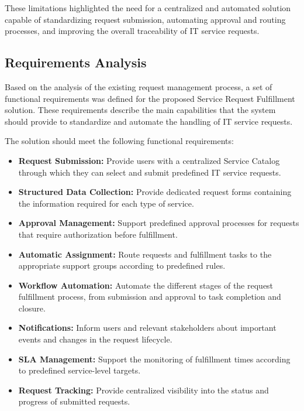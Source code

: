 \documentclass[12pt,a4paper]{report}
\begin{document}
These limitations highlighted the need for a centralized and automated
solution capable of standardizing request submission, automating approval and
routing processes, and improving the overall traceability of IT service
requests.

\subsection{Requirements Analysis}
Based on the analysis of the existing request management process, a set of
functional requirements was defined for the proposed Service Request
Fulfillment solution. These requirements describe the main capabilities that
the system should provide to standardize and automate the handling of IT
service requests.

The solution should meet the following functional requirements:
\begin{itemize}
    \item \textbf{Request Submission:} Provide users with a centralized
    Service Catalog through which they can select and submit predefined IT
    service requests.

    \item \textbf{Structured Data Collection:} Provide dedicated request
    forms containing the information required for each type of service.

    \item \textbf{Approval Management:} Support predefined approval processes
    for requests that require authorization before fulfillment.

    \item \textbf{Automatic Assignment:} Route requests and fulfillment tasks
    to the appropriate support groups according to predefined rules.

    \item \textbf{Workflow Automation:} Automate the different stages of the
    request fulfillment process, from submission and approval to task
    completion and closure.

    \item \textbf{Notifications:} Inform users and relevant stakeholders
    about important events and changes in the request lifecycle.

    \item \textbf{SLA Management:} Support the monitoring of fulfillment
    times according to predefined service-level targets.

    \item \textbf{Request Tracking:} Provide centralized visibility into the
    status and progress of submitted requests.

\end{itemize}
\end{document}
